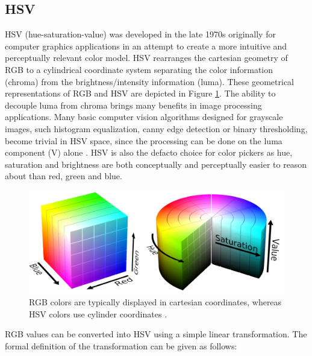\documentclass[thesis.tex]{subfiles}
\begin{document}
\subsection{HSV}

HSV (hue-saturation-value) was developed in the late 1970s originally for computer graphics applications in an attempt to create a more intuitive and perceptually relevant color model. HSV rearranges the cartesian geometry of RGB to a cylindrical coordinate system separating the color information (chroma) from the brightness/intensity information (luma). These geometrical representations of RGB and HSV are depicted in Figure \ref{figure:rgb_hsv}. The ability to decouple luma from chroma brings many benefits in image processing applications. Many basic computer vision algorithms designed for grayscale images, such histogram equalization, canny edge detection or binary thresholding, become trivial in HSV space, since the processing can be done on the luma component (V) alone \cite{color_segmentation}. HSV is also the defacto choice for color pickers as hue, saturation and brightness are both conceptually and perceptually easier to reason about than red, green and blue.

\begin{figure}[ht]
\centering \includegraphics[width=\textwidth]{images/rgb_hsv}
\caption{RGB colors are typically displayed in cartesian coordinates, whereas HSV colors use cylinder coordinates \cite{hsv_cylinder} \cite{rgb_cube}.\label{figure:rgb_hsv}}
\end{figure}

RGB values can be converted into HSV using a simple linear transformation. The formal definition of the transformation can be given as follows:
\end{document}
